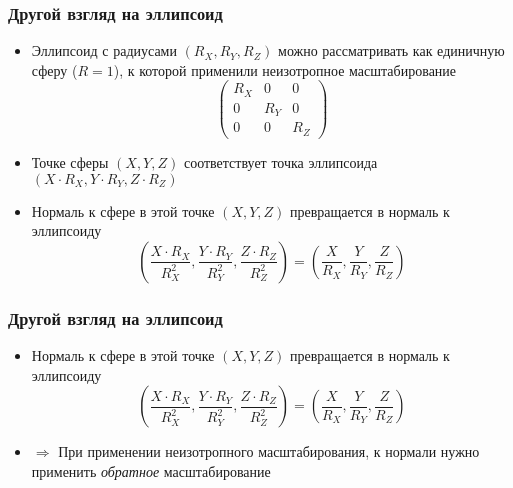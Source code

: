 \documentclass[10pt,handout]{beamer}
\begin{document}
\begin{frame}[fragile]
\frametitle{Другой взгляд на эллипсоид}
\begin{itemize}
\item Эллипсоид с радиусами \begin{math}(R_X, R_Y, R_Z)\end{math} можно рассматривать как единичную сферу (\begin{math}R=1\end{math}), к которой применили неизотропное масштабирование
\begin{equation*}
\begin{pmatrix}
R_X & 0 & 0 \\
0 & R_Y & 0 \\
0 & 0 & R_Z
\end{pmatrix}
\end{equation*}
\pause
\item Точке сферы \begin{math}(X, Y, Z)\end{math} соответствует точка эллипсоида \begin{math}(X\cdot R_X,Y\cdot R_Y,Z\cdot R_Z)\end{math}
\pause
\item Нормаль к сфере в этой точке \begin{math}(X, Y, Z)\end{math} превращается в нормаль к эллипсоиду
\begin{equation*}
\left(\frac{X\cdot R_X}{R_X^2},\frac{Y\cdot R_Y}{R_Y^2},\frac{Z\cdot R_Z}{R_Z^2}\right) = \left(\frac{X}{R_X},\frac{Y}{R_Y},\frac{Z}{R_Z}\right)
\end{equation*}
\end{itemize}
\end{frame}

\begin{frame}[fragile]
\frametitle{Другой взгляд на эллипсоид}
\begin{itemize}
\item Нормаль к сфере в этой точке \begin{math}(X, Y, Z)\end{math} превращается в нормаль к эллипсоиду
\begin{equation*}
\left(\frac{X\cdot R_X}{R_X^2},\frac{Y\cdot R_Y}{R_Y^2},\frac{Z\cdot R_Z}{R_Z^2}\right) = \left(\frac{X}{R_X},\frac{Y}{R_Y},\frac{Z}{R_Z}\right)
\end{equation*}
\pause
\item \begin{math}\Longrightarrow\end{math} При применении неизотропного масштабирования, к нормали нужно применить \textit{обратное} масштабирование
\end{itemize}
\end{frame}
\end{document}
